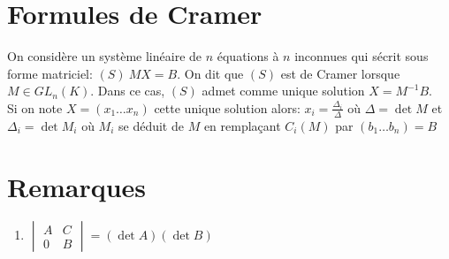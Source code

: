 \documentclass[fleqn]{article}
\theoremstyle{definition} \newtheorem*{defi}{D\'efinition}
\theoremstyle{definition} \newtheorem*{theo}{Th\'eor\`eme}
\theoremstyle{definition} \newtheorem*{coro}{Corollaire}
\theoremstyle{definition} \newtheorem*{nota}{Notation}
\theoremstyle{definition} \newtheorem*{vocab}{Vocabulaire}
\theoremstyle{remark} \newtheorem*{rqs}{Remarques}
\theoremstyle{definition} \newtheorem*{prop}{Propri\'et\'e}
\begin{document}
\section{Formules de Cramer}
On consid\`ere un syst\`eme lin\'eaire de $n$ \'equations \`a $n$ inconnues qui s\'ecrit sous forme matriciel: $(S)\ MX = B$. On dit que $(S)$ est
de Cramer lorsque $M \in GL_n(K)$. Dans ce cas, $(S)$ admet comme unique solution $X = M^{-1}B$. \\
Si on note $X = (x_1 \hdots x_n )$ cette unique solution alors: $x_i = \frac{\Delta_i}{\Delta}$ o\`u $\Delta = \det M$ et $\Delta_i = \det M_i$
o\`u $M_i$ se d\'eduit de $M$ en rempla\c{c}ant $C_i(M)$ par $(b_1 \hdots b_n) = B$

\section{Remarques}
\begin{enumerate}
	\item
		$\begin{vmatrix}
			A & C\\
			0 & B
		\end{vmatrix} = (\det A) (\det B)$
\end{enumerate}
\end{document}
